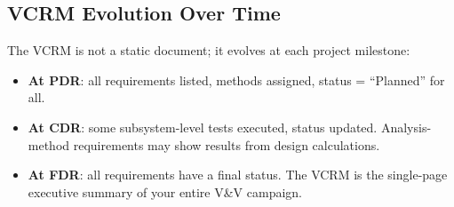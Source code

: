 \documentclass[11pt,letterpaper,twoside,openany]{book}
\begin{document}
\subsection{VCRM Evolution Over Time}
The VCRM is not a static document; it evolves at each project milestone:
\begin{itemize}[nosep,leftmargin=1.5em]
\item \textbf{At PDR}: all requirements listed, methods assigned, status = ``Planned'' for all.
\item \textbf{At CDR}: some subsystem-level tests executed, status updated. Analysis-method requirements may show results from design calculations.
\item \textbf{At FDR}: all requirements have a final status. The VCRM is the single-page executive summary of your entire V\&V campaign.
\end{itemize}
\end{document}
